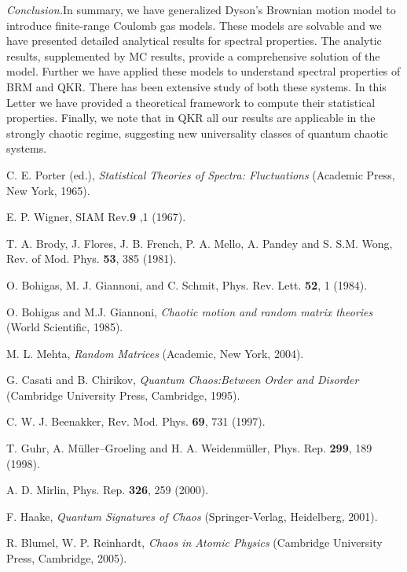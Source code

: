 \documentclass[reprint,amsmath,amssymb,showpacs,aps,]{revtex4-1}
\begin{document}
{\textit{Conclusion.}\textemdash In summary, we have generalized Dyson's Brownian motion model to introduce finite-range Coulomb gas models. These models are solvable and we have presented detailed analytical results for spectral properties. The analytic results, supplemented by MC results, provide a comprehensive solution of the model. Further we have applied these models to understand spectral properties of BRM and QKR. There has been extensive study of both these systems. In this Letter we have provided a theoretical framework to compute their statistical properties. Finally, we note that in QKR all our results are applicable in the strongly chaotic regime, suggesting new universality classes of quantum chaotic systems.

\begin{thebibliography}{9}

C. E. Porter (ed.), \textit{Statistical Theories of Spectra: Fluctuations} (Academic Press, New York, 1965).

E. P. Wigner, SIAM Rev.\textbf{9} ,1 (1967).

T. A. Brody, J. Flores, J. B. French, P. A. Mello, A. Pandey and S. S.M. Wong, Rev. of Mod. Phys. \textbf{53}, 385 (1981).
 
O. Bohigas, M. J. Giannoni, and C. Schmit, Phys. Rev. Lett. \textbf{52}, 1 (1984).

O. Bohigas and M.J. Giannoni, \textit{Chaotic motion and random matrix theories} (World Scientific, 1985).
 
M. L. Mehta, \textit{ Random Matrices }(Academic, New York, 2004).

G. Casati and B. Chirikov, \textit{Quantum Chaos:Between Order and Disorder} (Cambridge University Press, Cambridge, 1995).

C. W. J. Beenakker, Rev. Mod. Phys. \textbf{69}, 731 (1997).  

T. Guhr, A. Müller–Groeling and H. A. Weidenmüller, Phys. Rep. \textbf{299}, 189 (1998).

 A. D. Mirlin, Phys. Rep. \textbf{326}, 259 (2000).
    
F. Haake, \textit{Quantum Signatures of Chaos} (Springer-Verlag, Heidelberg, 2001).

R. Blumel, W. P. Reinhardt, \textit{Chaos in Atomic Physics} (Cambridge University Press, Cambridge, 2005).
  

\end{thebibliography}}
\end{document}
